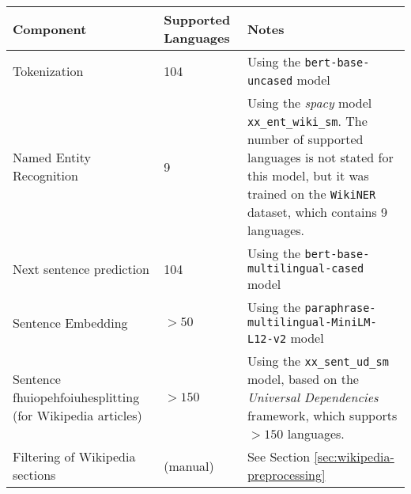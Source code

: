 	{
		\renewcommand{\arraystretch}{1.5}  %
		\begin{table}[H]
			\centering
			\begin{tabularx}{\textwidth}{|X|X|X|}
				\hline
				\textbf{Component}                          & \textbf{Supported Languages} & \textbf{Notes}                                                                                                                                                                                                                             \\
				\hline
				Tokenization                                & 104                          & Using the \texttt{bert-base-uncased} model\footnotemark[1]                                                                                                                                                                                 \\
				\hline
				Named Entity Recognition                    & 9                            & Using the \textit{spacy} model \texttt{xx\_ent\_wiki\_sm}\footnotemark[2]. The number of supported languages is not stated for this model, but it was trained on the \texttt{WikiNER} dataset\footnotemark[3], which contains 9 languages. \\
				\hline
				Next sentence prediction                    & 104                          & Using the \texttt{bert-base-multilingual-cased} model\footnotemark[4]                                                                                                                                                                      \\
				\hline
				Sentence Embedding                          & $>50$                        & Using the \texttt{paraphrase-multilingual-MiniLM-L12-v2} model\footnotemark[5]                                                                                                                                                             \\
				\hline
				Sentence fhuiopehfoiuhesplitting (for Wikipedia articles) & $>150$                       & Using the \texttt{xx\_sent\_ud\_sm} model\footnotemark[6], based on the \textit{Universal Dependencies} framework\footnotemark[7], which supports $>150$ languages.                                                                        \\
				\hline
				Filtering of Wikipedia sections             & (manual)                     & See Section \ref{sec:wikipedia-preprocessing}                                                                                                                                                                                              \\

\end{tabularx}
\end{table}}
